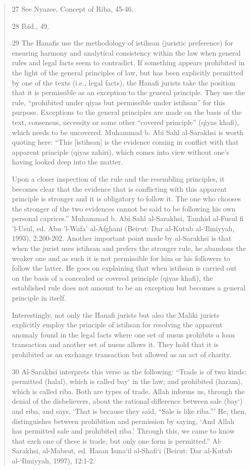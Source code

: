 \begin{quote}
27 See Nyazee, Concept of Riba, 45-46.

28 Ibid., 49.

29 The Hanafis use the methodology of istihsan (juristic preference) for ensuring harmony and analytical consistency within the law when general rules and legal facts seem to contradict. If something appears prohibited in the light of the general principles of law, but has been explicitly permitted by one of the texts (i.e., legal facts), the Hanafi jurists take the position that it is permissible as an exception to the general principle. They use the rule, “prohibited under qiyas but permissible under istihsan” for this purpose. Exceptions to the general principles are made on the basis of the text, consensus, necessity or some other “covered principle” (qiyas khafi), which needs to be uncovered. Muhammad b. Abi Sahl al-Sarakhsi is worth quoting here: “This [istihsan] is the evidence coming in conflict with that apparent principle (qiyas zahiri), which comes into view without one's having looked deep into the matter.

Upon a closer inspection of the rule and the resembling principles, it becomes clear that the evidence that is conflicting with this apparent principle is stronger and it is obligatory to follow it. The one who chooses the stronger of the two evidences cannot be said to be following his own personal caprices.” Muhammad b. Abi Sahl al-Sarakhsi, Tamhid al-Fusul fi 'l-Usul, ed. Abu 'l-Wafa' al-Afghani (Beirut: Dar al-Kutub al-‘Ilmiyyah, 1993), 2:200-202. Another important point made by al-Sarakhsi is that when the jurist uses istihsan and prefers the stronger rule, he abandons the weaker one and as such it is not permissible for him or his followers to follow the latter. He goes on explaining that when istihsan is carried out on the basis of a concealed or covered principle (qiyas khafi), the established rule does not amount to be an exception but becomes a general principle in itself.

Interestingly, not only the Hanafi jurists but also the Maliki jurists explicitly employ the principle of istihsan for resolving the apparent anomaly found in the legal facts where one set of nusus prohibits a loan transaction and another set of nusus allows it. They hold that it is prohibited as an exchange transaction but allowed as an act of charity.

30 Al-Sarakhsi interprets this verse as the following: “Trade is of two kinds: permitted (halal), which is called bay‘ in the law; and prohibited (haram), which is called riba. Both are types of trade. Allah informs us, through the denial of the disbelievers, about the rational difference between sale (bay‘) and riba, and says, ‘That is because they said, “Sale is like riba.”' He, then, distinguishes between prohibition and permission by saying, ‘And Allah has permitted sale and prohibited riba.' Through this, we came to know that each one of these is trade, but only one form is permitted.” Al-Sarakhsi, al-Mabsut, ed. Hasan Isma‘il al-Shafi‘i (Beirut: Dar al-Kutub al-‘Ilmiyyah, 1997), 12:1-2.


\end{quote}
